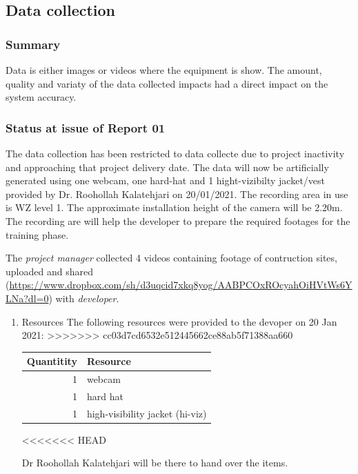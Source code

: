 \documentclass{article}
\begin{document}
\begin{enumerate}
\subsection{Data collection}
\label{sec:org37375c5}

\subsubsection{Summary}
\label{sec:orgdeedf11}
Data is either images or videos where the equipment is show.
The amount, quality and variaty of the data collected impacts had a direct impact on the system accuracy. 

\subsubsection{Status at issue of Report 01}
\label{sec:org33a1f66}
The data collection has been restricted to data collecte due to project inactivity and approaching that project delivery date.
The data will now be artificially generated using one webcam, one hard-hat and 1 hight-vizibilty jacket/vest provided by Dr. Roohollah Kalatehjari on 20/01/2021.
The recording area in use is WZ level 1.
The approximate installation height of the camera will be 2.20m. 
The recording are will help the developer to prepare the required footages for the training phase.

The \emph{project manager} collected 4 videos containing footage of contruction sites, uploaded and shared (\url{https://www.dropbox.com/sh/d3uqcid7xkq8yog/AABPCOxROcyahOiHVtWs6YLNa?dl=0}) with \emph{developer}.

\begin{enumerate}
\item Resources
\label{sec:orgea80c75}
The following resources were provided to the devoper on 20 Jan 2021:
>>>>>>> cc03d7cd6532e512445662ce88ab5f71388aa660

\begin{center}
\begin{tabular}{rl}
Quantitity & Resource\\
\hline
1 & webcam\\
1 & hard hat\\
1 & high-visibility jacket (hi-viz)\\
\end{tabular}
\end{center}
<<<<<<< HEAD

Dr Roohollah Kalatehjari will be there to hand over the items.


\end{enumerate}
\end{enumerate}
\end{document}
